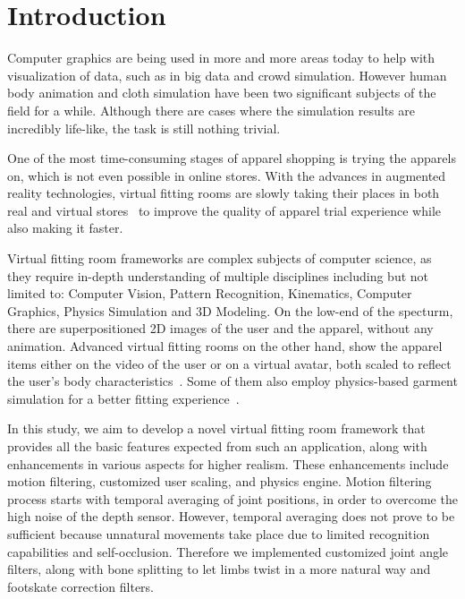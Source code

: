 \chapter{Introduction}
\label{chapter_introduction}

Computer graphics are being used in more and more areas today to help with visualization of data, such as in big data and crowd simulation.
However human body animation and cloth simulation have been two significant subjects of the field for a while. 
Although there are cases where the simulation results are incredibly life-like, the task is still nothing trivial. 

One of the most time-consuming stages of apparel shopping is trying the apparels on, which is not even possible in online stores. 
With the advances in augmented reality technologies, virtual fitting rooms are slowly taking their places in both real and virtual 
stores~\cite{Fitnect2012,Styku2013} to improve the quality of apparel trial experience while also making it faster.

Virtual fitting room frameworks are complex subjects of computer science, as they require in-depth understanding of multiple disciplines 
including but not limited to: Computer Vision, Pattern Recognition, Kinematics, Computer Graphics, Physics Simulation and 3D Modeling. 
On the low-end of the specturm, there are superpositioned 2D images of the user and the apparel, without any animation.
Advanced virtual fitting rooms on the other hand, show the apparel items either on the video 
of the user or on a virtual avatar, both scaled to reflect the user's body 
characteristics~\cite{FaceCake2013}. Some of them also employ physics-based 
garment simulation for a better fitting experience~\cite{Styku2013}.

In this study, we aim to develop a novel virtual fitting room framework that provides all the basic 
features expected from such an application, along with enhancements in various 
aspects for higher realism. These enhancements include motion filtering, 
customized user scaling, and physics engine. Motion filtering process 
starts with temporal averaging of joint positions,
in order to overcome the high noise of the depth sensor. However, temporal
averaging does not prove to be sufficient because unnatural movements take
place due to limited recognition capabilities and self-occlusion.
Therefore we implemented customized joint angle filters, along with bone
splitting to let limbs twist in a more natural way and footskate correction filters.

